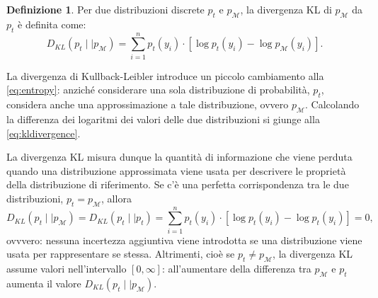 \documentclass[
  10pt,
  italian,
  a4paper,
  extrafontsizes,onecolumn,openright
  ]{memoir}
\newlength{\rf}
\theoremstyle{definition}
\newtheorem{definition}{Definizione}[chapter]
\theoremstyle{definition}
\theoremstyle{definition}
\theoremstyle{definition}
\theoremstyle{remark}
\begin{document}
\begin{definition}
Per due distribuzioni discrete \(p_t\) e \(p_{\mathcal{M}}\), la divergenza KL di \(p_{\mathcal{M}}\) da \(p_t\) è definita come:
\begin{equation}
D_{KL}(p_t \mid\mid p_{\mathcal{M}}) = \sum_{i=1}^n p_t(y_i) \cdot \left[\log p_t(y_i) - \log p_{\mathcal{M}}(y_i)\right].
\label{eq:kldivergence}
\end{equation}
\end{definition}

La divergenza di Kullback-Leibler introduce un piccolo cambiamento alla \eqref{eq:entropy}: anziché considerare una sola distribuzione di probabilità, \(p_t\), considera anche una approssimazione a tale distribuzione, ovvero \(p_{\mathcal{M}}\). Calcolando la differenza dei logaritmi dei valori delle due distribuzioni si giunge alla \eqref{eq:kldivergence}.

La divergenza KL misura dunque la quantità di informazione che viene perduta quando una distribuzione approssimata viene usata per descrivere le proprietà della distribuzione di riferimento.
Se c'è una perfetta corrispondenza tra le due distribuzioni, \(p_t = p_{\mathcal{M}}\), allora
\[
D_{KL}(p_t \mid\mid p_{\mathcal{M}}) = D_{KL}(p_t \mid\mid p_t) = \sum_{i=1}^n p_t(y_i) \cdot \left[\log p_t(y_i) - \log p_t(y_i)\right] = 0,
\]
ovvvero: nessuna incertezza aggiuntiva viene introdotta se una distribuzione viene usata per rappresentare se stessa. Altrimenti, cioè se \(p_t \neq p_{\mathcal{M}}\), la divergenza KL assume valori nell'intervallo \([0, \infty]\): all'aumentare della differenza tra \(p_{\mathcal{M}}\) e \(p_t\) aumenta il valore \(D_{KL}(p_t \mid\mid p_{\mathcal{M}})\).
\end{document}
